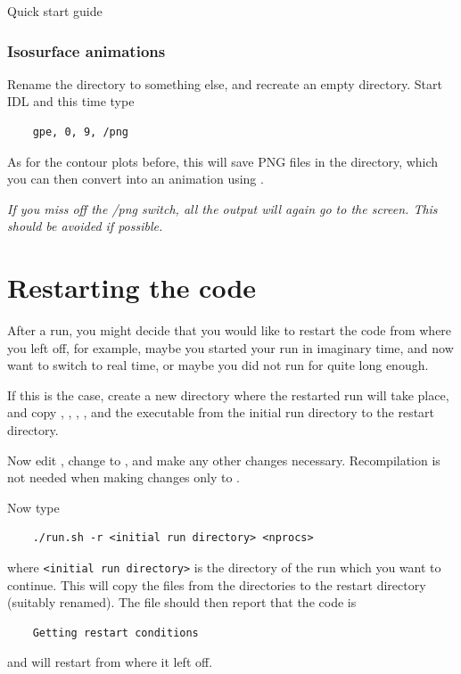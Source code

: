 \begin{chapter}{\label{cha:quickstart} Quick start guide}
  \subsubsection{Isosurface animations}
  Rename the  directory to something else, and recreate an
  empty  directory.  Start IDL and this time type
  \begin{Verbatim}
    gpe, 0, 9, /png
  \end{Verbatim}
  As for the contour plots before, this will save PNG files in the
   directory, which you can then convert into an animation
  using .

  \emph{If you miss off the /png switch, all the output will again go to the
  screen.  This should be avoided if possible.}

  \section{Restarting the code}
  After a run, you might decide that you would like to restart the code from
  where you left off, for example, maybe you started your run in imaginary
  time, and now want to switch to real time, or maybe you did not run for quite
  long enough.

  If this is the case, create a new directory where the restarted run will take
  place, and copy , , ,
  , and the executable  from the initial run
  directory to the restart directory.

  Now edit , change  to , and
  make any other changes necessary.  Recompilation is not needed when making
  changes only to .

  Now type
  \begin{Verbatim}
    ./run.sh -r <initial run directory> <nprocs>
  \end{Verbatim}
  where \verb"<initial run directory>" is the directory of the run which you
  want to continue.  This will copy the  files from the
   directories to the restart directory (suitably renamed).  The
   file should then report that the code is
  \begin{Verbatim}
    Getting restart conditions
  \end{Verbatim}
  and will restart from where it left off.
\end{chapter}

